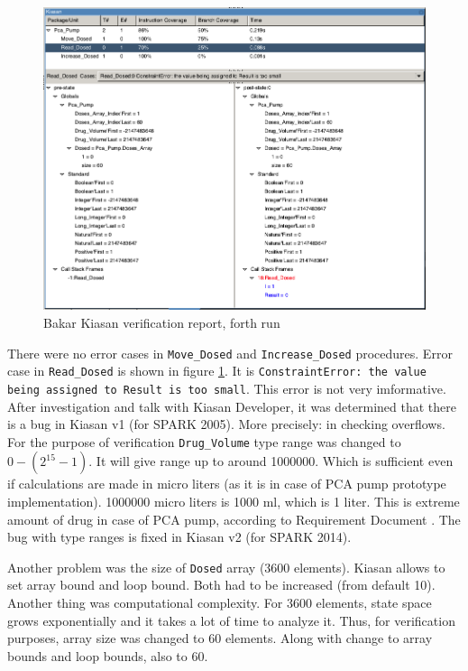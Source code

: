 \begin{figure}[ht]%
    \begin{center}
        \includegraphics[width=1.0\textwidth]{figures/pca-pump-verification-step4.png}
        \caption{Bakar Kiasan verification report, forth run}
    \end{center}
    \label{figure:sparkverification:kiasanreport4}
\end{figure}

There were no error cases in \lstinline{Move_Dosed} and \lstinline{Increase_Dosed} procedures. Error case in \lstinline{Read_Dosed} is shown in figure \ref{figure:sparkverification:kiasanreport4}. It is \lstinline{ConstraintError: the value being assigned to Result is too small}. This error is not very imformative. After investigation and talk with Kiasan Developer, it was determined that there is a bug in Kiasan v1 (for SPARK 2005). More precisely: in checking overflows. For the purpose of verification \lstinline{Drug_Volume} type range was changed to $0 - (2^{15} - 1)$. It will give range up to around 1000000. Which is sufficient even if calculations are made in micro liters (as it is in case of PCA pump prototype implementation). 1000000 micro liters is 1000 ml, which is 1 liter. This is extreme amount of drug in case of PCA pump, according to Requirement Document \cite{OpenSourcePCAPump:Paper}. The bug with type ranges is fixed in Kiasan v2 (for SPARK 2014).

Another problem was the size of \lstinline{Dosed} array (3600 elements). Kiasan allows to set array bound and loop bound. Both had to be increased (from default 10). Another thing was computational complexity. For 3600 elements, state space grows exponentially and it takes a lot of time to analyze it. Thus, for verification purposes, array size was changed to 60 elements. Along with change to array bounds and loop bounds, also to 60.

